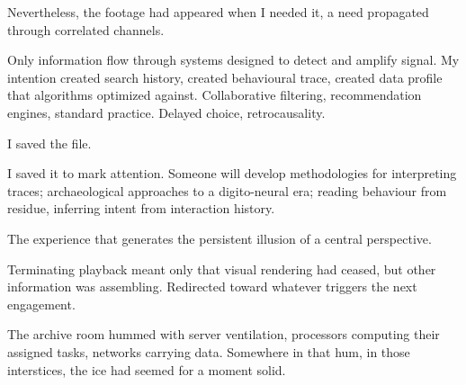 Nevertheless, the footage had appeared when I needed it, a need propagated through correlated channels.

Only information flow through systems designed to detect and amplify signal. My intention created search history, created behavioural trace, created data profile that algorithms optimized against. Collaborative filtering, recommendation engines, standard practice. Delayed choice, retrocausality.

I saved the file.


I saved it to mark attention. Someone will develop methodologies for interpreting traces; archaeological approaches to a digito-neural era; reading behaviour from residue, inferring intent from interaction history.

The experience that generates the persistent illusion of a central perspective.

Terminating playback meant only that visual rendering had ceased, but other information was assembling. Redirected toward whatever triggers the next engagement.

The archive room hummed with server ventilation, processors computing their assigned tasks, networks carrying data. Somewhere in that hum, in those interstices, the ice had seemed for a moment solid.
